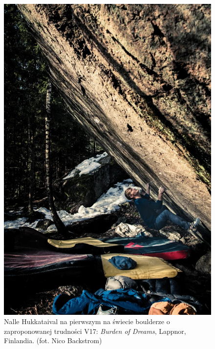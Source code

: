 \documentclass{article}
\begin{document}
\pagebreak
\begin{figure}[!htbp]
	\begin{center}
		\includegraphics[width=0.9\linewidth]{images/hukkataival.eps}
	\end{center}
	\caption{Nalle Hukkataival na pierwszym na świecie boulderze o zaproponowanej trudności V17: \textit{Burden of Dreams}, Lappnor, Finlandia. (fot. Nico Backstrom) \cite{climb-hukka}}
	\label{hukka}
\end{figure}

\nocite{*}
\printbibliography
\end{document}
